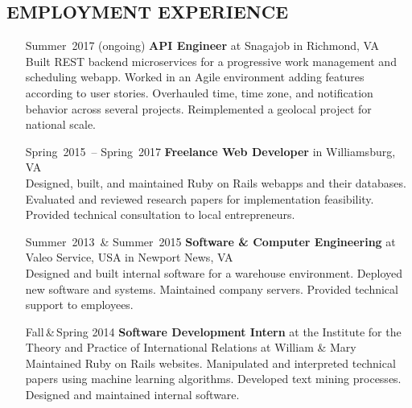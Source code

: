 \documentclass{res}     %
\begin{document}
\begin{resume}
\section{EMPLOYMENT EXPERIENCE}
\vspace{5mm}
\begin{itemize}[font=\itshape,align=parleft,labelwidth=3cm,leftmargin=2cm]
    \item[Summer~2017 (ongoing)]
        \textbf{API Engineer}
        at Snagajob
        in Richmond, VA
        \vspace{1mm} \\
        Built REST backend microservices for a progressive work management and scheduling webapp.
        Worked in an Agile environment adding features according to user stories.
        Overhauled time, time zone, and notification behavior across several projects.
        Reimplemented a geolocal project for national scale.
    \item[Spring~2015~-- Spring~2017]
        \textbf{Freelance Web Developer}
        in Williamsburg, VA
        \vspace{1mm} \\
        Designed, built, and maintained Ruby on Rails webapps and their databases.
        Evaluated and reviewed research papers for implementation feasibility.
        Provided technical consultation to local entrepreneurs.
    \item[Summer~2013~\& Summer~2015]
        \textbf{Software \& Computer Engineering}
        at Valeo Service, USA
        in Newport News, VA
        \vspace{1mm} \\
        Designed and built internal software for a warehouse environment.
        Deployed new software and systems.
        Maintained company servers.
        Provided technical support to employees.
    \item[Fall\,\&\,Spring 2014]
        \textbf{Software Development Intern}
        at the Institute for the Theory and Practice of International Relations
        at William \& Mary
        \vspace{1mm} \\
        Maintained Ruby on Rails websites.
        Manipulated and interpreted technical papers using machine learning algorithms.
        Developed text mining processes.
        Designed and maintained internal software.
\end{itemize}


\end{resume}
\end{document}
